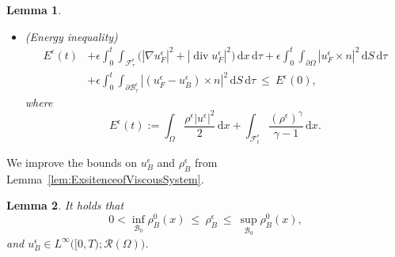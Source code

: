\documentclass[11pt,twoside,reqno]{amsart}
\numberwithin{equation}{section}
\numberwithin{figure}{section}
\newtheorem{lemma}{Lemma}[section]
\begin{document}
\begin{lemma}
\begin{itemize}
\item[6.] (Energy inequality)
\begin{equation}\label{eq:EnergyInequalityofVisSys}
\begin{aligned}
E^\epsilon(t)
&+ \epsilon \int_0^t \!\!\int_{\mathcal{F}_\tau^\epsilon} \big( |\nabla u_F^\epsilon|^2 + |\operatorname{div} u_F^\epsilon|^2 \big)\,\mathrm{d}x\,\mathrm{d}\tau
+ \epsilon \int_0^t \!\!\int_{\partial \Omega} |u_F^\epsilon \times n|^2 \,\mathrm{d}S\,\mathrm{d}\tau\\
&+ \epsilon \int_0^t \!\!\int_{\partial \mathcal{B}_\tau^\epsilon} |(u_F^\epsilon - u_B^\epsilon)\times n|^2 \,\mathrm{d}S\,\mathrm{d}\tau
\ \le\ E^\epsilon(0),
\end{aligned}
\end{equation}
where
\[
E^\epsilon(t) := \int_{\Omega} \frac{\rho^\epsilon |u^\epsilon|^2}{2}\, \mathrm{d}x
+ \int_{\mathcal{F}_t^\epsilon} \frac{(\rho^\epsilon)^\gamma}{\gamma-1}\, \mathrm{d}x.
\]
\end{itemize}
\end{lemma}

We improve the bounds on $u_B^\epsilon$ and $\rho_B^\epsilon$ from Lemma~\ref{lem:ExsitenceofViscousSystem}.

\begin{lemma}
It holds that
\begin{equation}\label{eq:BoundsonDesity}
0<\inf_{\mathcal{B}_0} \rho_B^0(x) \ \le \ \rho_B^\epsilon \ \le \ \sup_{\mathcal{B}_0} \rho_B^0(x),
\end{equation}
and $u_B^\epsilon \in L^\infty\big([0,T); \mathcal{R}(\Omega)\big)$.
\end{lemma}
\end{document}

